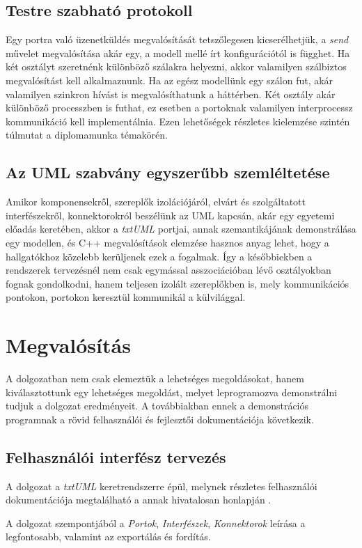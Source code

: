 \documentclass[a4paper,12pt]{report}
\begin{document}
\section{Testre szabható protokoll}
Egy portra való üzenetküldés megvalósítását tetszőlegesen kicserélhetjük, a \textit{send} művelet megvalósítása akár egy, a modell mellé írt konfigurációtól is függhet. Ha két osztályt szeretnénk különböző szálakra helyezni, akkor valamilyen szálbiztos megvalósítást kell alkalmaznunk. Ha az egész modellünk egy szálon fut, akár valamilyen szinkron hívást is megvalósíthatunk a háttérben. Két osztály akár különböző processzben is futhat, ez esetben a portoknak valamilyen interprocessz kommunikáció kell implementálnia. Ezen lehetőségek részletes kielemzése szintén túlmutat a diplomamunka témakörén. 

\section{Az UML szabvány egyszerűbb szemléltetése}
Amikor komponensekről, szereplők izolációjáról, elvárt és szolgáltatott interfészekről, konnektorokról beszélünk az UML kapcsán, akár egy egyetemi előadás keretében, akkor a \textit{txtUML} portjai, annak szemantikájának demonstrálása egy modellen, és C++ megvalósítások elemzése hasznos anyag lehet, hogy a hallgatókhoz közelebb kerüljenek ezek a fogalmak. Így a későbbiekben a rendszerek tervezésnél nem csak egymással asszociációban lévő osztályokban fognak gondolkodni, hanem teljesen izolált szereplőkben is, mely kommunikációs pontokon, portokon keresztül kommunikál a külvilággal. 


\chapter{Megvalósítás}
A dolgozatban nem csak elemeztük a lehetséges megoldásokat, hanem kiválasztottunk egy lehetséges megoldást, melyet leprogramozva demonstrálni tudjuk a dolgozat eredményeit. A továbbiakban ennek a demonstrációs programnak a rövid felhasználói és fejlesztői dokumentációja következik.

\section{Felhasználói interfész tervezés}
A dolgozat a \textit{txtUML} keretrendszerre épül, melynek részletes felhasználói dokumentációja megtalálható a annak hivatalosan honlapján \cite{txtuml_web}.

A dolgozat szempontjából a \textit{Portok}, \textit{Interfészek}, \textit{Konnektorok} leírása a legfontosabb, valamint az exportálás és fordítás.
\end{document}

